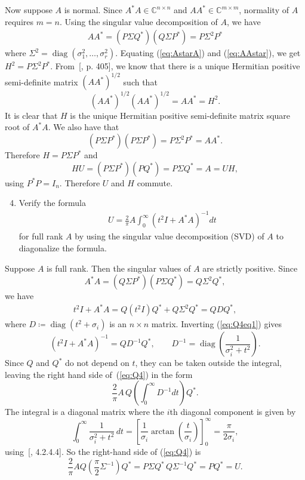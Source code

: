 \documentclass[10pt, A4paper]{article}
\newcommand{\mxm}{m \times m}
\newcommand{\nxn}{n \times n}
\DeclareMathOperator{\diag}{diag}
\begin{document}
Now suppose $A$ is normal. Since $A^*A \in \mathbb{C}^{n\times n}$ and
$AA^* \in \mathbb{C}^{\mxm}$, normality of $A$ requires $m=n$.
Using the singular value decomposition of $A$, we have
\begin{align}
	AA^* = (P\Sigma Q^*) (Q\Sigma P^*) = P\Sigma^2 P^*
	\label{eq:AAstar}
\end{align}
where $\Sigma^2 = \diag(\sigma_1^2, \ldots,\sigma_r^2)$.
Equating (\ref{eq:AstarA}) and (\ref{eq:AAstar}), we get 
$H^2 = P\Sigma^2P^*$. From~[\citealp{hojo1985}, p. 405], we know 
that there
is a unique Hermitian positive semi-definite matrix $(AA^*)^{1/2}$ such 
that $$(AA^*)^{1/2}(AA^*)^{1/2} = AA^* = H^2.$$
It is clear that $H$ is the unique Hermitian positive semi-definite 
matrix square root of $A^*A$.
We also have that
$$(P\Sigma P^*) (P\Sigma P^*) = P \Sigma^2P^* = AA^*.$$
Therefore $H = P\Sigma P^*$ and
$$HU = (P\Sigma P^*) (PQ^*) = P \Sigma Q^* = A = UH,$$
using $P^*P = I_n$. Therefore $U$ and $H$ commute.
 
 
 
 

\vspace{0.2cm}
\begin{enumerate}
	\setcounter{enumi}{3}
	\item Verify the formula
	\begin{align*}
		U = \frac{2}{\pi}A \int_{0}^{\infty} (t^2I + A^*A)^{-1}dt
		\tag{*}
		\label{eq:Q4}
	\end{align*}
	for full rank $A$ by using the singular value decomposition (SVD)
	of $A$ to diagonalize the formula.
\end{enumerate}

Suppose $A$ is full rank. Then the singular values of $A$ are strictly 
positive. Since 
$$A^*A = (Q\Sigma P^*)(P\Sigma Q^*) = Q\Sigma^2Q^*,$$
we have
\begin{align}
	t^2I + A^*A = Q(t^2I)Q^* + Q \Sigma^2Q^* = QDQ^*,
	\label{eq:Q4eq1}
\end{align}
where $D \coloneqq \diag(t^2 + \sigma_i)$ is an $\nxn$ matrix.
Inverting (\ref{eq:Q4eq1}) gives
$$
	(t^2I + A^*A)^{-1} = QD^{-1}Q^*, \qquad
	D^{-1} = \diag\left(\frac{1}{\sigma_i^2 + t^2} \right).
$$
Since $Q$ and $Q^*$ do not depend on $t$, they can be taken outside the 
integral, leaving the right hand side of~(\ref{eq:Q4}) in the form
$$
	\frac{2}{\pi} A\, Q \left(\int_{0}^{\infty}D^{-1}dt\right) Q^*.
$$
The integral is a diagonal matrix where the $i$th diagonal component is 
given by
$$
	\int_{0}^{\infty} \frac{1}{\sigma_i^2 + t^2} \, dt =
	\left[\frac{1}{\sigma_i} \arctan \left(\frac{t}{\sigma_i}\right)
	\right]_0^{\infty} = \frac{\pi}{2\sigma_i},
$$
using~[\citealp{jeda2008}, 4.2.4.4]. So the right-hand side of 
(\ref{eq:Q4}) is
$$
	\frac{2}{\pi} A Q \left(\frac{\pi}{2} \Sigma^{-1}\right)Q^* = 
	P\Sigma Q^* \, Q \Sigma^{-1}Q^* = PQ^* = U.
$$
\end{document}
